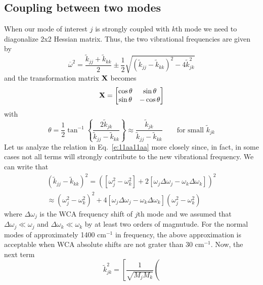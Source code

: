 \documentclass[a4paper,titlepage,twoside,fleqn,12pt]{book}
\begin{document}
\begin{refsection}
\subsection{Coupling between two modes}

When our mode of interest $j$ is strongly coupled
with $k$th mode we need to diagonalize 2x2 Hessian matrix.
Thus, the two vibrational frequencies are given by
%
\begin{equation} \label{e:11aa11aa}
 \overline{\omega}^2 = %
\frac{ \tilde{k}_{jj} + \tilde{k}_{kk} }{2}
\pm \frac{1}{2}
\sqrt{\left( \tilde{k}_{jj} - \tilde{k}_{kk}\right)^2 - 4\tilde{k}_{jk}^2}
\end{equation}
%
and the transformation matrix $\bf X$ becomes
%
\begin{equation} \label{e:ohoho}
 {\bf X} = 
\begin{bmatrix}
\cos{\theta} &   \sin{\theta}\\ 
\sin{\theta} &  -\cos{\theta}
\end{bmatrix}
\end{equation}
%
with
%
\begin{equation}
\theta = \frac{1}{2} \tan^{-1}\left\{\frac{2\tilde{k}_{jk}}{\tilde{k}_{jj} - \tilde{k}_{kk}}\right\} 
 \approx \frac{\tilde{k}_{jk}}{\tilde{k}_{jj} - \tilde{k}_{kk}} \qquad\text{for small $\tilde{k}_{jk}$}
\end{equation}
%
Let us analyze the relation in Eq.~\eqref{e:11aa11aa} more closely
since, in fact, in some cases not all terms will strongly contribute to the new vibrational
frequency. We can write that
%
\begin{multline}
 \left( \tilde{k}_{jj} - \tilde{k}_{kk}\right)^2 = 
 \left( \left[ \omega_j^2 - \omega_k^2 \right] 
 +
 2\left[ \omega_j\Delta\omega_j - \omega_k\Delta\omega_k \right]\right)^2 \\
 \approx \left( \omega_j^2 - \omega_k^2 \right)^2
 + 4 \left[ \omega_j\Delta\omega_j - \omega_k\Delta\omega_k \right] \left( \omega_j^2 - \omega_k^2 \right)
\end{multline}
%
where $\Delta\omega_j$ is the WCA frequency shift of $j$th mode
and we assumed that $\Delta\omega_j\ll\omega_j$ and $\Delta\omega_k\ll\omega_k$
by at least two orders of magnutude. For the
normal modes of approximately 1400 cm$^{-1}$
in frequency, the above approximation is acceptable
when WCA absolute shifts are not grater than 30 cm$^{-1}$.
Now, the next term
%
\begin{equation}
 \tilde{k}_{jk}^2 = \left[ \frac{1}{\sqrt{M_jM_k}}
  \left( 

\end{equation}
\end{refsection}
\end{document}
